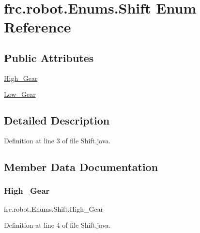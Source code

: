 \hypertarget{enumfrc_1_1robot_1_1_enums_1_1_shift}{}\section{frc.\+robot.\+Enums.\+Shift Enum Reference}
\label{enumfrc_1_1robot_1_1_enums_1_1_shift}
\subsection*{Public Attributes}
\begin{DoxyCompactItemize}
\item 
\hyperlink{enumfrc_1_1robot_1_1_enums_1_1_shift_a66efd5ef2833112e313f06303c7c6003}{High\+\_\+\+Gear}
\item 
\hyperlink{enumfrc_1_1robot_1_1_enums_1_1_shift_a057c3458651c7a916da4241ae52b56d0}{Low\+\_\+\+Gear}
\end{DoxyCompactItemize}


\subsection{Detailed Description}


Definition at line 3 of file Shift.\+java.



\subsection{Member Data Documentation}
\mbox{\label{enumfrc_1_1robot_1_1_enums_1_1_shift_a66efd5ef2833112e313f06303c7c6003}} 
\subsubsection{\texorpdfstring{High\+\_\+\+Gear}{High\_Gear}}
{\footnotesize\ttfamily frc.\+robot.\+Enums.\+Shift.\+High\+\_\+\+Gear}



Definition at line 4 of file Shift.\+java.

\mbox{\label{enumfrc_1_1robot_1_1_enums_1_1_shift_a057c3458651c7a916da4241ae52b56d0}} 
